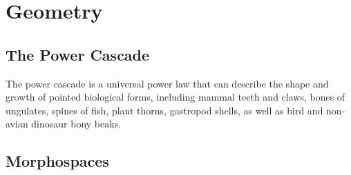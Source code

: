 \section{Geometry}


\subsection{The Power Cascade}

The power cascade is a universal power law that can describe the shape and growth of pointed biological forms, including mammal teeth and claws, bones of ungulates, spines of fish, plant thorns, gastropod shells, as well as bird and non-avian dinosaur bony beaks.

\subsection{Morphospaces}

